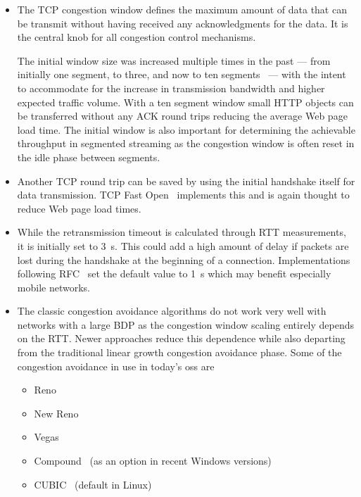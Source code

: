 \begin{itemize}
	\item The \gls{TCP} congestion window defines the maximum amount of data that can be transmit without having received any acknowledgments for the data. It is the central knob for all congestion control mechanisms.

	The initial window size was increased multiple times in the past --- from initially one segment, to three, and now to ten segments~\cite{rfc6928} ---  with the intent to accommodate for the increase in transmission bandwidth and higher expected traffic volume. With a ten segment window small \gls{HTTP} objects can be transferred without any ACK round trips reducing the average Web page load time. The initial window is also important for determining the achievable throughput in segmented streaming as the congestion window is often reset in the idle phase between segments.

	\item Another \gls{TCP} round trip can be saved by using the initial handshake itself for data transmission. \gls{TCP} Fast Open~\cite{cheng2014tcptfo} implements this and is again thought to reduce Web page load times.

	\item While the retransmission timeout is calculated through \gls{RTT} measurements, it is initially set to \SI{3}{\second}. This could add a high amount of delay if packets are lost during the handshake at the beginning of a connection. Implementations following RFC~\cite{rfc6298} set the default value to \SI{1}{\second} which may benefit especially mobile networks.

	\item The classic congestion avoidance algorithms do not work very well with networks with a large \gls{BDP} as the congestion window scaling entirely depends on the \gls{RTT}. Newer approaches reduce this dependence while also departing from the traditional linear growth congestion avoidance phase. Some of the congestion avoidance in use in today's \glspl{os} are 

	\begin{itemize}
		\item Reno~\cite{rfc5681}
		\item New Reno~\cite{rfc6582}
		\item Vegas~\cite{Brakmo:1994:TVN:190809.190317}
		\item Compound~\cite{song2006compound} (as an option in recent Windows versions)
		\item CUBIC~\cite{ha2008cubic} (default in Linux)
	\end{itemize}
\end{itemize}


